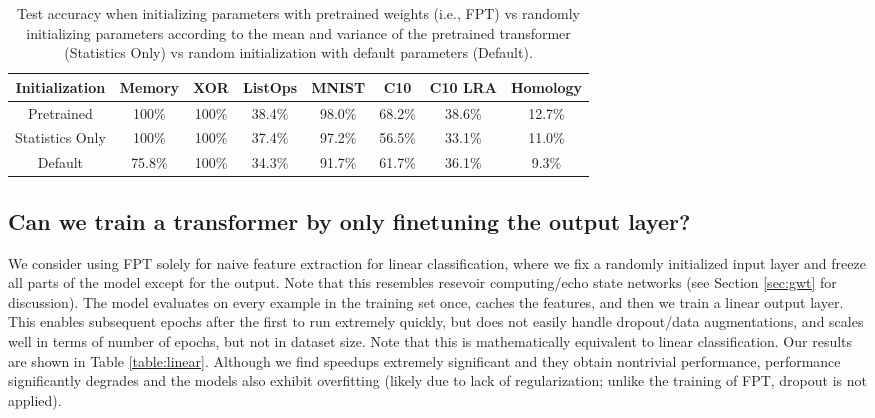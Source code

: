 \begin{table}[H] 
\begin{center}
\begin{tabular}{c|ccccccc}
\toprule
\textbf{Initialization} & \multicolumn{1}{c}{\bf Memory} & \multicolumn{1}{c}{\bf XOR} & \multicolumn{1}{c}{\bf ListOps} & \multicolumn{1}{c}{\bf MNIST} & \multicolumn{1}{c}{\bf C10} & \multicolumn{1}{c}{\bf C10 LRA} & \multicolumn{1}{c}{\bf Homology} \\
\midrule
Pretrained & 100\% & 100\% & 38.4\% & 98.0\% & 68.2\% & 38.6\% & 12.7\% \\
Statistics Only & 100\% & 100\% & 37.4\% & 97.2\% & 56.5\% & 33.1\% & 11.0\% \\
Default & 75.8\% & 100\% & 34.3\% & 91.7\% & 61.7\% & 36.1\% & 9.3\% \\
\bottomrule
\end{tabular}
\end{center}
\caption{Test accuracy when initializing parameters with pretrained weights (i.e., FPT) vs randomly initializing parameters according to the mean and variance of the pretrained transformer (Statistics Only) vs random initialization with default parameters (Default).}\label{table:initialization}
\end{table}
\vspace{-1.8em}

\subsection{Can we train a transformer by only finetuning the output layer?}
\label{sec:reservoir}

We consider using FPT solely for naive feature extraction for linear classification, where we fix a randomly initialized input layer and freeze all parts of the model except for the output.
Note that this resembles resevoir computing/echo state networks (see Section \ref{sec:gwt} for discussion).
The model evaluates on every example in the training set once, caches the features, and then we train a linear output layer.
This enables subsequent epochs after the first to run extremely quickly, but does not easily handle dropout/data augmentations, and scales well in terms of number of epochs, but not in dataset size.
Note that this is mathematically equivalent to linear classification.
Our results are shown in Table \ref{table:linear}.
Although we find speedups extremely significant and they obtain nontrivial performance, performance significantly degrades and the models also exhibit overfitting (likely due to lack of regularization; unlike the training of FPT, dropout is not applied).

